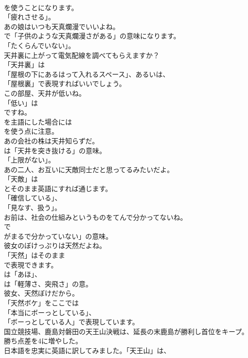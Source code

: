 \documentclass[8pt]{extreport}
\begin{document}
\begin{CJK}{UTF8}{min}
\\	を使うことになります。
\\	「疲れさせる」。	
\\	あの娘はいつも天真爛漫でいいよね。 
\\	で「子供のような天真爛漫さがある」の意味になります。
\\	「たくらんでいない」。	
\\	天井裏に上がって電気配線を調べてもらえますか？ 
\\	「天井裏」は
\\	「屋根の下にあるはって入れるスペース」、あるいは、
\\	「屋根裏」で表現すればいいでしょう。	
\\	この部屋、天井が低いね。 
\\	「低い」は 
\\	ですね。
\\	を主語にした場合には 
\\	を使う点に注意。	
\\	あの会社の株は天井知らずだ。 
\\	は「天井を突き抜ける」の意味。
\\	「上限がない」。	
\\	あの二人、お互いに天敵同士だと思ってるみたいだよ。 
\\	「天敵」は
\\	とそのまま英語にすれば通じます。
\\	「確信している」、
\\	「見なす、扱う」。	
\\	お前は、社会の仕組みというものをてんで分かってないね。 
\\	で
\\	がまるで分かっていない」の意味。	
\\	彼女のぼけっぷりは天然だよね。 
\\	「天然」はそのまま 
\\	で表現できます。
\\	は「あほ」、
\\	は「軽薄さ、突飛さ」の意。	
\\	彼女、天然ぼけだから。 
\\	「天然ボケ」をここでは
\\	「本当にボーっとしている」、
\\	「ボーっとしている人」で表現しています。	
\\	国立競技場、鹿島対磐田の天王山決戦は、延長の末鹿島が勝利し首位をキープ。勝ち点差を4に増やした。 
\\	日本語を忠実に英語に訳してみました。「天王山」は、

\end{CJK}
\end{document}
